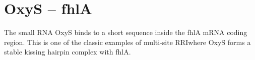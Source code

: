 \documentclass[twoside,a4paper]{report}
\begin{document}
%
%			

\clearpage		
	\section{OxyS – fhlA}
	
	The small RNA OxyS binds to a short sequence inside the fhlA mRNA coding region. This is one of the classic examples of multi-site RRIwhere OxyS forms a stable kissing hairpin complex with fhlA. \\
	
\end{document}
